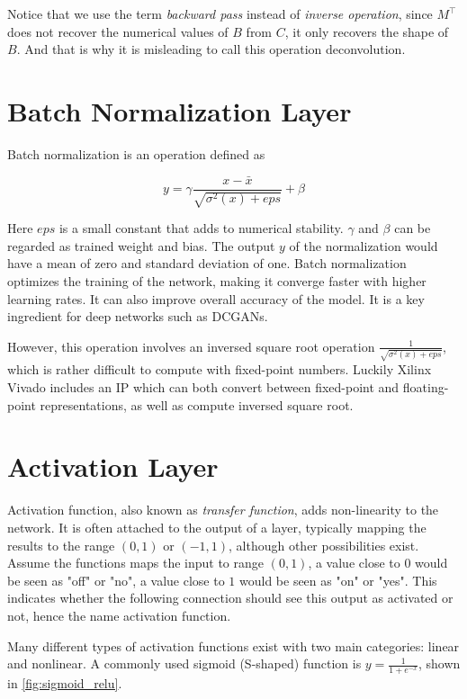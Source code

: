 Notice that we use the term \textit{backward pass} instead of \textit{inverse operation}, since $M^\intercal$
does not recover the numerical values of $B$ from $C$, it only recovers the shape of $B$. And that is why it
is misleading to call this operation deconvolution.

\section{Batch Normalization Layer}

Batch normalization is an operation defined as

\begin{equation} \label{eq:batch_normalization}
  y = \gamma \frac{x - \bar{x}}{\sqrt{\sigma^2(x) + {eps}}} + \beta
\end{equation}

Here $eps$ is a small constant that adds to numerical stability. $\gamma$ and $\beta$ can be regarded
as trained weight and bias. The output $y$ of the normalization would have a mean of zero and standard
deviation of one. Batch normalization optimizes the training of the network, making it converge
faster with higher learning rates. It can also improve overall accuracy of the model. It is a key ingredient
for deep networks such as DCGANs.

However, this operation involves an inversed square root operation $\frac{1}{\sqrt{\sigma^2(x) + eps}}$,
which is rather difficult to compute with fixed-point numbers. Luckily Xilinx Vivado includes an IP which
can both convert between fixed-point and floating-point representations, as well as compute inversed square
root.

\section{Activation Layer}

Activation function, also known as \textit{transfer function}, adds non-linearity to the network. It is often
attached to the output of a layer, typically mapping the results to the range $(0, 1)$ or $(-1, 1)$, although
other possibilities exist. Assume the functions maps the input to range $(0, 1)$, a value close to $0$ would
be seen as "off" or "no", a value close to $1$ would be seen as "on" or "yes". This indicates whether the
following connection should see this output as activated or not, hence the name activation function.

Many different types of activation functions exist with two main categories: linear and nonlinear. A commonly
used sigmoid (S-shaped) function is $y = \frac{1}{1 + e^{-x}}$, shown in \ref{fig:sigmoid_relu}.

